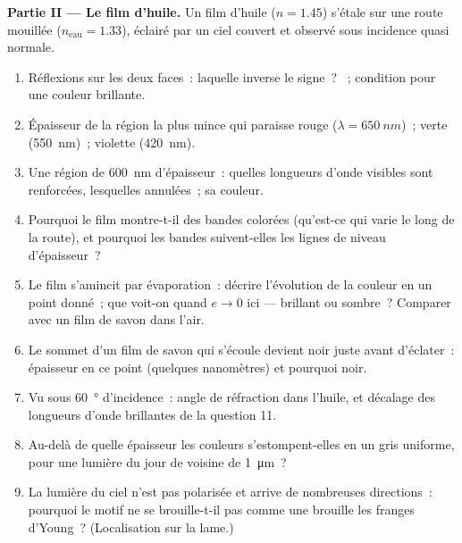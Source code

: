 \begin{problem}
\medskip
\noindent\textbf{Partie II --- Le film d'huile.}
Un film d'huile ($n = 1.45$) s'étale sur une route mouillée ($n_{\text{eau}} = 1.33$),
éclairé par un ciel couvert et observé sous incidence quasi normale.
\begin{enumerate}[resume]
  \item Réflexions sur les deux faces~: laquelle inverse le signe~? ~; condition pour une couleur brillante.
  \item Épaisseur de la région la plus mince qui paraisse rouge ($\lambda =
        \qty{650}{nm}$)~; verte (\qty{550}{nm})~; violette (\qty{420}{nm}).
  \item Une région de \qty{600}{nm} d'épaisseur~: quelles longueurs d'onde visibles sont
        renforcées, lesquelles annulées~; sa couleur.
  \item Pourquoi le film montre-t-il des bandes colorées (qu'est-ce qui varie le long de la
        route), et pourquoi les bandes suivent-elles les lignes de niveau d'épaisseur~?
  \item Le film s'amincit par évaporation~: décrire l'évolution de la
        couleur en un point donné~; que voit-on quand $e \to 0$
        ici --- brillant ou sombre~? Comparer avec un film de savon dans l'air.
  \item Le sommet d'un film de savon qui s'écoule devient noir juste avant
        d'éclater~: épaisseur en ce point (quelques nanomètres) et pourquoi noir.
  \item Vu sous \qty{60}{\degree} d'incidence~: angle de réfraction dans l'huile,
        et décalage des longueurs d'onde brillantes de la question 11.
  \item Au-delà de quelle épaisseur les couleurs s'estompent-elles en un gris
        uniforme, pour une lumière du jour de  voisine de \qty{1}{\micro m}~?
  \item La lumière du ciel n'est pas polarisée et arrive de nombreuses
        directions~: pourquoi le motif ne se brouille-t-il pas comme une 
        brouille les franges d'Young~? (Localisation sur la lame.)
\end{enumerate}


\end{problem}
